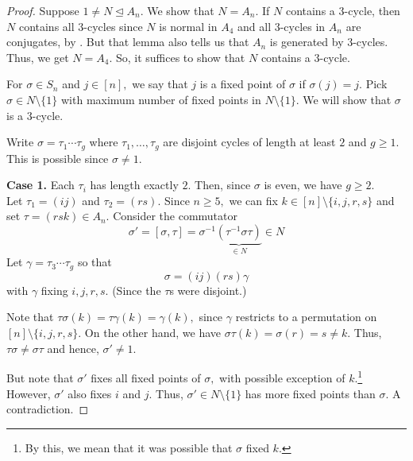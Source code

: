 \Ansimple*\label{thm:Ansimple2}
\begin{flushright}\hyperref[thm:Ansimple]{\upsym}\end{flushright}
\begin{proof}
    Suppose $1 \neq N \unlhd A_n.$ We show that $N = A_n.$ If $N$ contains a $3$-cycle, then $N$ contains all $3$-cycles since $N$ is normal in $A_4$ and all $3$-cycles in $A_n$ are conjugates, by . But that lemma also tells us that $A_n$ is generated by $3$-cycles. Thus, we get $N = A_4.$ So, it suffices to show that $N$ contains a $3$-cycle.

    For $\sigma \in S_n$ and $j \in [n],$ we say that $j$ is a fixed point of $\sigma$ if $\sigma(j) = j.$ Pick $\sigma \in N \setminus \{1\}$ with maximum number of fixed points in $N \setminus \{1\}.$ We will show that $\sigma$ is a $3$-cycle.

    Write $\sigma = \tau_1 \cdots \tau_g$ where $\tau_1, \ldots, \tau_g$ are disjoint cycles of length at least $2$ and $g \ge 1.$ This is possible since $\sigma \neq 1.$

    \textbf{Case 1.} Each $\tau_i$ has length exactly $2.$ Then, since $\sigma$ is even, we have $g \ge 2.$\\
    Let $\tau_1 = (i j)$ and $\tau_2 = (r s).$ Since $n \ge 5,$ we can fix $k \in [n] \setminus \{i, j, r, s\}$ and set $\tau = (r s k) \in A_n.$ Consider the commutator
    \begin{equation*} 
        \sigma' = [\sigma, \tau] = \sigma^{-1}\underbrace{(\tau^{-1}\sigma\tau)}_{\in N} \in N
    \end{equation*}
    Let $\gamma = \tau_3 \cdots \tau_g$ so that
    \begin{equation*} 
        \sigma = (i j)(r s)\gamma
    \end{equation*}
    with $\gamma$ fixing $i, j, r, s.$ (Since the $\tau$s were disjoint.)

    Note that $\tau\sigma(k) = \tau\gamma(k) = \gamma(k),$ since $\gamma$ restricts to a permutation on $[n] \setminus \{i, j, r, s\}.$ On the other hand, we have $\sigma\tau(k) = \sigma(r) = s \neq k.$ Thus, $\tau\sigma \neq \sigma\tau$ and hence, $\sigma' \neq 1.$

    But note that $\sigma'$ fixes all fixed points of $\sigma,$ with possible exception of $k.$\footnote{By this, we mean that it was possible that $\sigma$ fixed $k.$} However, $\sigma'$ also fixes $i$ and $j.$ Thus, $\sigma' \in N \setminus \{1\}$ has more fixed points than $\sigma.$ A contradiction.


\end{proof}
